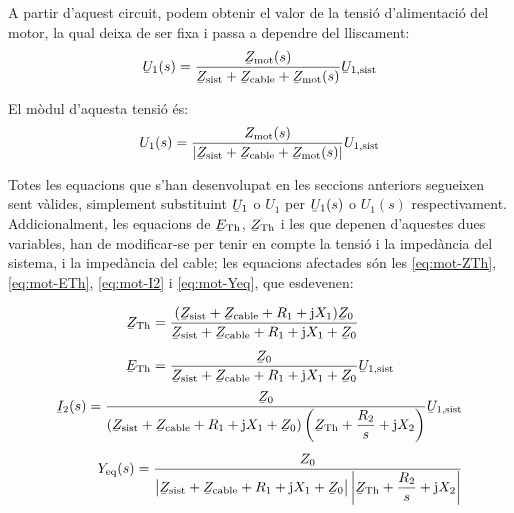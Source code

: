 A partir d'aquest circuit, podem obtenir  el valor de la tensió d'alimentació del motor, la qual deixa de ser fixa i passa a dependre del  lliscament:
\begin{equation}
	\cmplx{U}_1(s) = \frac{\cmplx{Z}\ped{mot}(s)}{\cmplx{Z}\ped{sist} + \cmplx{Z}\ped{cable} +  \cmplx{Z}\ped{mot}(s)} \cmplx{U}\ped{1,sist}\label{eq:mot-U-redu}
\end{equation}

El mòdul d'aquesta tensió és:
\begin{equation}
	U_1(s) = \frac{Z\ped{mot}(s)}{|\cmplx{Z}\ped{sist} + \cmplx{Z}\ped{cable} +  \cmplx{Z}\ped{mot}(s)|} U\ped{1,sist}
\end{equation}

Totes les equacions que s'han desenvolupat en les seccions anteriors segueixen sent vàlides, simplement substituint $\cmplx{U}_1$ o $U_1$ per  $\cmplx{U}_1(s)$ o $U_1(s)$ respectivament. Addicionalment, les equacions de $\cmplx{E}\ped{Th}$, $\cmplx{Z}\ped{Th}$ i les que depenen d'aquestes dues variables, han de modificar-se per tenir en compte la tensió i la impedància del sistema, i la impedància del cable; les equacions afectades són les \eqref{eq:mot-ZTh}, \eqref{eq:mot-ETh}, \eqref{eq:mot-I2} i \eqref{eq:mot-Yeq}, que esdevenen:

\begin{subequations}
	\begin{align}
	\cmplx{Z}\ped{Th} &= \frac{(\cmplx{Z}\ped{sist} + \cmplx{Z}\ped{cable} + R_1 + \ju X_1) \cmplx{Z}_0}{\cmplx{Z}\ped{sist} + \cmplx{Z}\ped{cable} + R_1 + \ju X_1 + \cmplx{Z}_0} \label{eq:mot-ZTh-redu}\\[1ex]
	\cmplx{E}\ped{Th} &= \frac{\cmplx{Z}_0}{\cmplx{Z}\ped{sist} + \cmplx{Z}\ped{cable} + R_1 + \ju X_1 + \cmplx{Z}_0} \cmplx{U}\ped{1,sist} \label{eq:mot-ETh-redu}
	\end{align}
\end{subequations}
\begin{align}
	\cmplx{I}_2(s) = \frac{\cmplx{Z}_0}{(\cmplx{Z}\ped{sist} + \cmplx{Z}\ped{cable} + R_1 + \ju X_1 + \cmplx{Z}_0)\left(\cmplx{Z}\ped{Th} + \dfrac{R_2}{s} + \ju X_2\right)} \cmplx{U}\ped{1,sist} \\[1ex]
	Y\ped{eq}(s) = \frac{Z_0}{\big|\cmplx{Z}\ped{sist} + \cmplx{Z}\ped{cable} + R_1 + \ju X_1 + \cmplx{Z}_0\big|\left|\cmplx{Z}\ped{Th} + \dfrac{R_2}{s} + \ju X_2\right|} \label{eq:mot-Yeq-redu}
\end{align}

